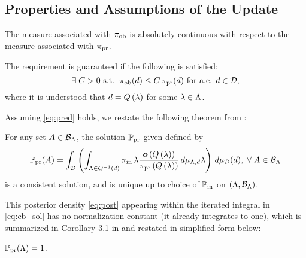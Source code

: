 \subsection{Properties and Assumptions of the Update}
\begin{frame}[t]
\begin{assumption}\label{as:pred}
The measure associated with $\operatorname*{\pi_{ob}}$ is absolutely continuous with respect to the measure associated with $\operatorname*{\pi_{pr}}$.
\end{assumption}


The requirement is guaranteed if the following is satisfied:
\begin{equation}\label{eq:pred}
\exists \; C>0 \text{ s.t. } \operatorname*{\pi_{ob}} (d) \leq C \operatorname*{\pi_{pr}} (d) \text{ for a.e. } d\in \mathcal{D},
\end{equation}
where it is understood that $d = Q\left ( \lambda \right )$ for some $\lambda \in {\Lambda}$.

Assuming \eqref{eq:pred} holds, we restate the following theorem from \cite{BJW18}:
\begin{theorem}
For any set $A\in \mathcal{B}_{{\Lambda}}$, the solution $\operatorname*{\mathbb{P}_{pr}}$ given defined by
\begin{equation}\label{eq:cb_sol}
\operatorname*{\mathbb{P}_{pr}} (A) = \int_{\mathcal{D}} \left (  \int_{{\Lambda} \in Q^{-1}(d)}  \operatorname*{\pi_{in}}\lambda \frac{\operatorname*{\boldsymbol{o}}\left ( Q\left ( \lambda \right ) \right )}{\operatorname*{\pi_{pr}}\left ( Q\left ( \lambda \right ) \right )} \, d\mu_{{\Lambda}, d} \lambda \right ) \, d\mu_{\mathcal{D}}(d), \; \forall \; A \in \mathcal{B}_{{\Lambda}}
\end{equation}
is a consistent solution, and is unique up to choice of $\operatorname*{\mathbb{P}_{in}}$ on $({\Lambda}, \mathcal{B}_{{\Lambda}})$.
\end{theorem}

\end{frame}

\begin{frame}[t]

This posterior density \eqref{eq:post} appearing within the iterated integral in \eqref{eq:cb_sol} has no normalization constant (it already integrates to one), which is summarized in Corollary 3.1 in \cite{BJW18} and restated in simplified form below:
\begin{corollary}\label{cor:int}
$\operatorname*{\mathbb{P}_{pr}}({\Lambda}) = 1$.
\end{corollary}

\end{frame}




